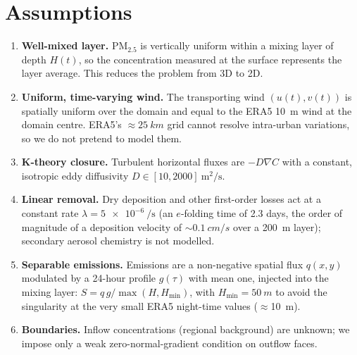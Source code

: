 \documentclass[11pt,a4paper]{article}
\newcommand{\PMtwo}{PM$_{2.5}$}
\begin{document}
\section{Assumptions}
\label{sec:assumptions}
\begin{enumerate}
\item[A1] \textbf{Well-mixed layer.} \PMtwo{} is vertically uniform within a mixing layer of depth $H(t)$, so
the concentration measured at the surface represents the layer average. This reduces the problem from 3D to 2D.
\item[A2] \textbf{Uniform, time-varying wind.} The transporting wind $(u(t),v(t))$ is spatially uniform over the
domain and equal to the ERA5 10~m wind at the domain centre. ERA5's $\approx\SI{25}{km}$ grid cannot resolve
intra-urban variations, so we do not pretend to model them.
\item[A3] \textbf{K-theory closure.} Turbulent horizontal fluxes are $-D\nabla C$ with a constant, isotropic eddy
diffusivity $D\in[10,2000]~\si{\metre\squared\per\second}$.
\item[A4] \textbf{Linear removal.} Dry deposition and other first-order losses act at a constant rate
$\lambda=\SI{5e-6}{\per\second}$ (an $e$-folding time of 2.3 days, the order of magnitude of a deposition
velocity of $\sim\SI{0.1}{cm/s}$ over a \SI{200}{m} layer); secondary aerosol chemistry is not modelled.
\item[A5] \textbf{Separable emissions.} Emissions are a non-negative spatial flux $q(x,y)$ modulated by a 24-hour
profile $g(\tau)$ with mean one, injected into the mixing layer: $S=q\,g/\max(H,H_{\min})$, with
$H_{\min}=\SI{50}{m}$ to avoid the singularity at the very small ERA5 night-time values ($\approx$\SI{10}{m}).
\item[A6] \textbf{Boundaries.} Inflow concentrations (regional background) are unknown; we impose only a weak
zero-normal-gradient condition on outflow faces.


\end{enumerate}
\end{document}
